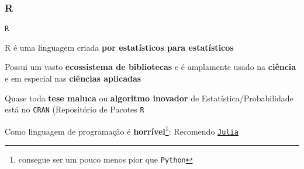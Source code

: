 
\subsubsection{R}
\begin{frame}{\texttt{R}}
	\begin{vfilleditems}
		\item R é uma linguagem criada \textbf{por estatísticos para estatísticos}
		\item Possui um vasto \textbf{ecossistema de bibliotecas} e é amplamente usado na \textbf{ciência} e em especial nas \textbf{ciências aplicadas}
		\item Quase toda \textbf{tese maluca} ou \textbf{algoritmo inovador} de Estatística/Probabilidade está no \texttt{CRAN} (Repositório de Pacotes \texttt{R}
		\item Como linguagem de programação é \textbf{horrível}\footnote{consegue ser um pouco menos pior que \texttt{Python}}: Recomendo \href{https://julialang.org/}{\texttt{Julia}}
	\end{vfilleditems}
\end{frame}

